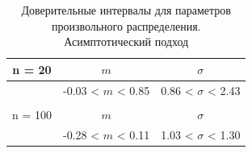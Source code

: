 \begin{table}[H]
	\centering
	\begin{tabular}{| c | c | c |}
		\hline
		n = 20   &  $m$  & $\sigma$\\ \hline
		&  -0.03 < $m$ < 0.85 & 0.86 < $\sigma$ < 2.43 \\ \hline
		&   &   \\ \hline
		n = 100   &  $m$  & $\sigma$\\ \hline
		& -0.28 < $m$ < 0.11 & 1.03 < $\sigma$ < 1.30 \\
		\hline
	\end{tabular}
	\caption{Доверительные интервалы для параметров произвольного распределения. Асимптотический подход}
	\label{tab:interv_asimpt}
\end{table}

\newpage